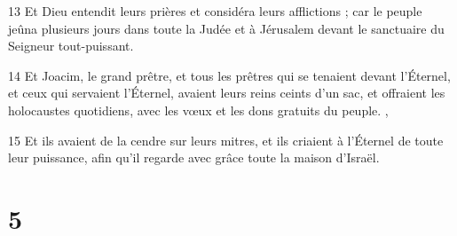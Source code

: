 \par 13 Et Dieu entendit leurs prières et considéra leurs afflictions ; car le peuple jeûna plusieurs jours dans toute la Judée et à Jérusalem devant le sanctuaire du Seigneur tout-puissant.
\par 14 Et Joacim, le grand prêtre, et tous les prêtres qui se tenaient devant l'Éternel, et ceux qui servaient l'Éternel, avaient leurs reins ceints d'un sac, et offraient les holocaustes quotidiens, avec les vœux et les dons gratuits du peuple. ,
\par 15 Et ils avaient de la cendre sur leurs mitres, et ils criaient à l'Éternel de toute leur puissance, afin qu'il regarde avec grâce toute la maison d'Israël.

\chapter{5}

